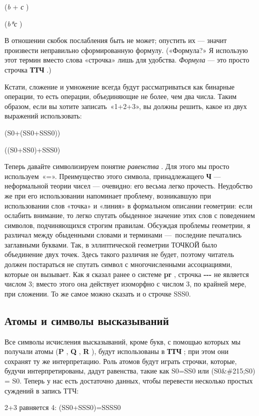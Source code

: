 \documentclass[../main.tex]{subfiles}
\begin{document}
(\emph{b} + \emph{с} )

(\emph{b*с} )

В отношении скобок послабления быть не может; опустить их --- значит произвести неправильно сформированную формулу. («Формула?» Я использую этот термин вместо слова «строчка» лишь для удобства. \emph{Формула} --- это просто строчка \textbf{ТТЧ} .)

Кстати, сложение и умножение всегда будут рассматриваться как бинарные операции, то есть операции, объединяющие не более, чем два числа. Таким образом, если вы хотите записать~«1+2+3», вы должны решить, какое из двух выражений использовать:

(S0+(SS0+SSS0))

((S0+SS0)+SSS0)

Теперь давайте символизируем понятие \emph{равенства} . Для этого мы просто используем~«=». Преимущество этого символа, принадлежащего \textbf{Ч} --- неформальной теории чисел --- очевидно: его весьма легко прочесть. Неудобство же при его использовании напоминает проблему, возникавшую при использовании слов «точка» и «линия» в формальном описании геометрии: если ослабить внимание, то легко спутать обыденное значение этих слов с поведением символов, подчиняющихся строгим правилам. Обсуждая проблемы геометрии, я различал между обыденными словами и терминами ---~последние печатались заглавными буквами. Так, в эллиптической геометрии ТОЧКОЙ было объединение двух точек. Здесь такого различия не будет, поэтому читатель должен постараться не спутать символ с многочисленными ассоциациями, которые он вызывает. Как я сказал ранее о системе \textbf{pr} , строчка \textbf{-\/-\/-} не является числом 3; вместо этого она действует изоморфно с числом 3, по крайней мере, при сложении. То же самое можно сказать и о строчке SSS0.


\subsection{Атомы и символы высказываний}

Все символы исчисления высказываний, кроме букв, с помощью которых мы получали атомы (\textbf{P} , \textbf{Q} , \textbf{R} ), будут использованы в \textbf{ТТЧ} ; при этом они сохранят ту же интерпретацию. Роль атомов будут играть строчки, которые, будучи интерпретированы, дадут равенства, такие как S0=SS0 или (S0\&\#215;S0) = S0. Теперь у нас есть достаточно данных, чтобы перевести несколько простых суждений в запись ТТЧ:

2+3 равняется 4: (SS0+SSS0)=SSSS0
\end{document}
